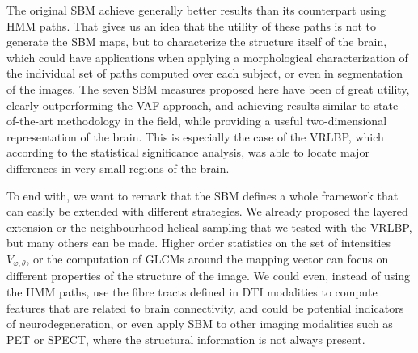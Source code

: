 The original \ac{SBM} achieve generally better results than its counterpart using \ac{HMM} paths. That gives us an idea that the utility of these paths is not to generate the \ac{SBM} maps, but to characterize the structure itself of the brain, which could have applications when applying a morphological characterization of the individual set of paths computed over each subject, or even in segmentation of the images. The seven \ac{SBM} measures proposed here have been of great utility, clearly outperforming the \ac{VAF} approach, and achieving results similar to state-of-the-art methodology in the field, while providing a useful two-dimensional representation of the brain. This is especially the case of the \ac{VRLBP}, which according to the statistical significance analysis, was able to locate major differences in very small regions of the brain. 

To end with, we want to remark that the \ac{SBM} defines a whole framework that can easily be extended with different strategies. We already proposed the layered extension or the neighbourhood helical sampling that we tested with the \ac{VRLBP}, but many others can be made. Higher order statistics on the set of intensities $V_{\varphi,\theta}$, or the computation of \acp{GLCM} around the mapping vector can focus on different properties of the structure of the image. We could even, instead of using the \ac{HMM} paths, use the fibre tracts defined in \ac{DTI} modalities to compute features that are related to brain connectivity, and could be potential indicators of neurodegeneration, or even apply \ac{SBM} to other imaging modalities such as \ac{PET} or \ac{SPECT}, where the structural information is not always present.
	